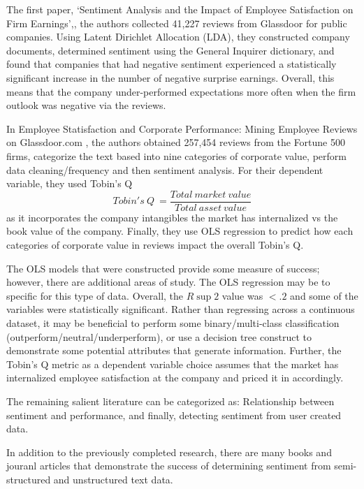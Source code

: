 \documentclass[conference, letterpaper]{IEEEtran}
\begin{document}
The first paper, `Sentiment Analysis and the Impact of Employee Satisfaction on Firm Earnings',\cite{Moniz2014}, the authors collected 41,227 reviews from Glassdoor for public companies. 
Using Latent Dirichlet Allocation (LDA), they constructed company documents, determined sentiment using the General Inquirer dictionary, and found that companies that had negative sentiment experienced a statistically significant increase in the number of negative surprise earnings.  
Overall, this means that the company under-performed expectations more often when the firm outlook was negative via the reviews.

In Employee Statisfaction and Corporate Performance: Mining Employee Reviews on Glassdoor.com \cite{luo2016employee}, the authors obtained 257,454 reviews from the Fortune 500 firms, categorize the text based into nine categories of corporate value, perform data cleaning/frequency and then sentiment analysis.
For their dependent variable, they used Tobin's Q 
\[
Tobin's\ Q\ = \frac{Total\ market\ value}{Total\ asset\ value}
\]
as it incorporates the company intangibles the market has internalized vs the book value of the company.
Finally, they use OLS regression to predict how each categories of corporate value in reviews impact the overall Tobin's Q.

The OLS models that were constructed provide some measure of success; however, there are additional areas of study.
The OLS regression may be to specific for this type of data.  
Overall, the $R\sup{2}$ value was $<.2$ and some of the variables were statistically significant.  
Rather than regressing across a continuous dataset, it may be beneficial to perform some binary/multi-class classification (outperform/neutral/underperform), or use a decision tree construct to demonstrate some potential attributes that generate information.
Further, the Tobin's Q metric as a dependent variable choice assumes that the market has internalized employee satisfaction at the company and priced it in accordingly.

The remaining salient literature can be categorized as: Relationship between sentiment and performance, and finally, detecting sentiment from user created data.

In addition to the previously completed research, there are many books and jouranl articles\cite{pang2008opinion}\cite{aggarwal2012mining}\cite{miner2012practical} that demonstrate the success of determining sentiment from semi-structured and unstructured text data.
\end{document}
